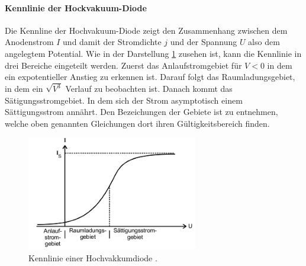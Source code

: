 \paragraph{Kennlinie der Hockvakuum-Diode}
Die Kennline der Hochvakuum-Diode zeigt den Zusammenhang zwischen
dem Anodenstrom $I$ und damit der Stromdichte $j$ und der Spannung $U$ also dem
angelegtem Potential. Wie in der Darstellung \ref{fig:KL} zusehen ist, kann die
Kennlinie in drei Bereiche eingeteilt werden. Zuerst das Anlaufstromgebiet
für $ V < 0$ in dem ein expotentieller Anstieg zu erkennen ist. Darauf folgt
das Raumladungsgebiet, in dem ein $\sqrt{V^3}$ Verlauf zu beobachten ist. Danach
kommt das Sätigungsstromgebiet. In dem sich der Strom asymptotisch einem
Sättigungsstrom annährt. Den Bezeichungen der Gebiete ist zu entnehmen, welche
oben genannten Gleichungen dort ihren Gültigkeitsbereich finden.
\begin{figure}
  \centering
  \includegraphics[height=5cm]{logos/Kennlinie.png}
  \caption{Kennlinie einer Hochvakkumdiode \cite{Anleitung}.}
  \label{fig:KL}
\end{figure}
